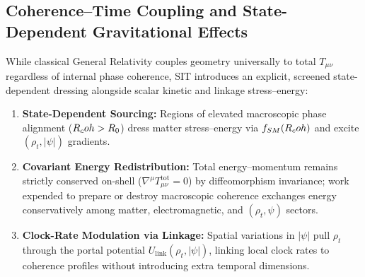 \subsection{Coherence--Time Coupling and State-Dependent Gravitational Effects}

While classical General Relativity couples geometry universally to total $T_{\mu\nu}$ regardless of internal phase coherence, SIT introduces an explicit, screened state-dependent dressing alongside scalar kinetic and linkage stress--energy:
\begin{enumerate}[leftmargin=2em]
  \item \textbf{State-Dependent Sourcing:} Regions of elevated macroscopic phase alignment ($R_coh > R_0$) dress matter stress--energy via $f_{SM}(R_coh)$ and excite $(\rho_t, |\psi|)$ gradients.
  \item \textbf{Covariant Energy Redistribution:} Total energy--momentum remains strictly conserved on-shell ($\nabla^\mu T_{\mu\nu}^{\mathrm{tot}} = 0$) by diffeomorphism invariance; work expended to prepare or destroy macroscopic coherence exchanges energy conservatively among matter, electromagnetic, and $(\rho_t, \psi)$ sectors.
  \item \textbf{Clock-Rate Modulation via Linkage:} Spatial variations in $|\psi|$ pull $\rho_t$ through the portal potential $U_{\mathrm{link}}(\rho_t, |\psi|)$, linking local clock rates to coherence profiles without introducing extra temporal dimensions.
\end{enumerate}

